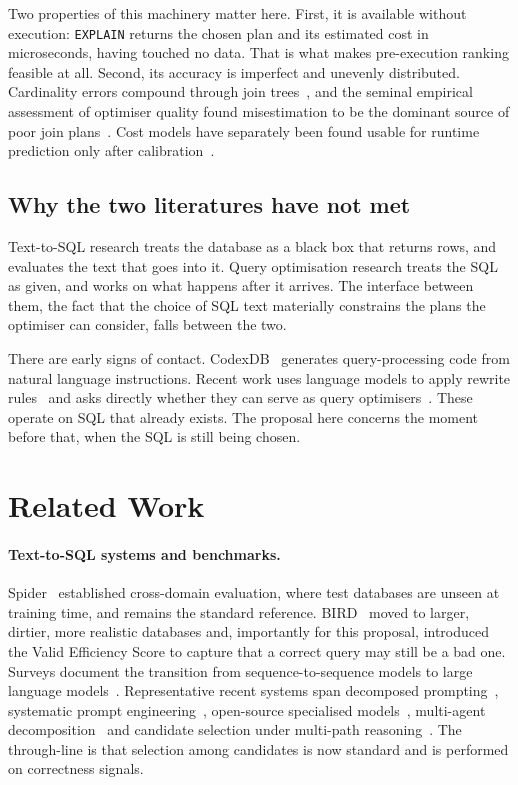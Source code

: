 \documentclass[12pt, a4paper]{article}
\begin{document}
Two properties of this machinery matter here. First, it is available
without execution: \texttt{EXPLAIN} returns the chosen plan and its
estimated cost in microseconds, having touched no data. That is what
makes pre-execution ranking feasible at all. Second, its accuracy is
imperfect and unevenly distributed. Cardinality errors compound through
join trees~\cite{ioannidis1991propagation}, and the seminal empirical
assessment of optimiser quality found misestimation to be the dominant
source of poor join plans~\cite{leis2015good, leis2018query}. Cost
models have separately been found usable for runtime prediction only
after calibration~\cite{wu2013predicting}.

\subsection{Why the two literatures have not met}

Text-to-SQL research treats the database as a black box that returns
rows, and evaluates the text that goes into it. Query optimisation
research treats the SQL as given, and works on what happens after it
arrives. The interface between them, the fact that the choice of SQL
text materially constrains the plans the optimiser can consider, falls
between the two.

There are early signs of contact. CodexDB~\cite{trummer2022codexdb}
generates query-processing code from natural language instructions.
Recent work uses language models to apply rewrite
rules~\cite{zhou2024llmr2} and asks directly whether they can serve as
query optimisers~\cite{zhu2024llmquery}. These operate on SQL that
already exists. The proposal here concerns the moment before that, when
the SQL is still being chosen.

\section{Related Work}
\label{sec:related}

\paragraph{Text-to-SQL systems and benchmarks.}
Spider~\cite{yu2018spider} established cross-domain evaluation, where
test databases are unseen at training time, and remains the standard
reference. BIRD~\cite{li2023bird} moved to larger, dirtier, more
realistic databases and, importantly for this proposal, introduced the
Valid Efficiency Score to capture that a correct query may still be a
bad one. Surveys document the transition from sequence-to-sequence
models to large language
models~\cite{katsogiannis2023survey}. Representative recent systems span
decomposed prompting~\cite{pourreza2023dinsql}, systematic prompt
engineering~\cite{gao2024dailsql}, open-source specialised
models~\cite{li2024codes}, multi-agent
decomposition~\cite{wang2025macsql} and candidate selection under
multi-path reasoning~\cite{pourreza2024chase}. The through-line is that
selection among candidates is now standard and is performed on
correctness signals.
\end{document}
